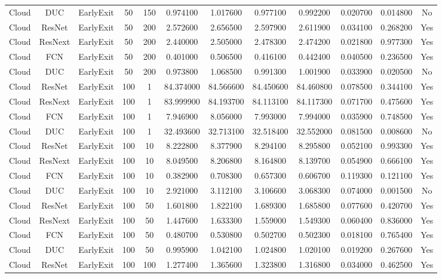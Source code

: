 \begin{tabular}{|c||c||c||c||c||c||c||c||c||c||c||c|}
Cloud & DUC & EarlyExit & 50 & 150 & 0.974100 & 1.017600 & 0.977100 & 0.992200 & 0.020700 & 0.014800 & No \\
Cloud & ResNet & EarlyExit & 50 & 200 & 2.572600 & 2.656500 & 2.597900 & 2.611900 & 0.034100 & 0.268200 & Yes \\
Cloud & ResNext & EarlyExit & 50 & 200 & 2.440000 & 2.505000 & 2.478300 & 2.474200 & 0.021800 & 0.977300 & Yes \\
Cloud & FCN & EarlyExit & 50 & 200 & 0.401000 & 0.506500 & 0.416100 & 0.442400 & 0.040500 & 0.236500 & Yes \\
Cloud & DUC & EarlyExit & 50 & 200 & 0.973800 & 1.068500 & 0.991300 & 1.001900 & 0.033900 & 0.020500 & No \\
Cloud & ResNet & EarlyExit & 100 & 1 & 84.374000 & 84.566600 & 84.450600 & 84.460800 & 0.078500 & 0.344100 & Yes \\
Cloud & ResNext & EarlyExit & 100 & 1 & 83.999900 & 84.193700 & 84.113100 & 84.117300 & 0.071700 & 0.475600 & Yes \\
Cloud & FCN & EarlyExit & 100 & 1 & 7.946900 & 8.056000 & 7.993000 & 7.994000 & 0.035900 & 0.748500 & Yes \\
Cloud & DUC & EarlyExit & 100 & 1 & 32.493600 & 32.713100 & 32.518400 & 32.552000 & 0.081500 & 0.008600 & No \\
Cloud & ResNet & EarlyExit & 100 & 10 & 8.222800 & 8.377900 & 8.294100 & 8.295800 & 0.052100 & 0.993300 & Yes \\
Cloud & ResNext & EarlyExit & 100 & 10 & 8.049500 & 8.206800 & 8.164800 & 8.139700 & 0.054900 & 0.666100 & Yes \\
Cloud & FCN & EarlyExit & 100 & 10 & 0.382900 & 0.708300 & 0.657300 & 0.606700 & 0.119300 & 0.121100 & Yes \\
Cloud & DUC & EarlyExit & 100 & 10 & 2.921000 & 3.112100 & 3.106600 & 3.068300 & 0.074000 & 0.001500 & No \\
Cloud & ResNet & EarlyExit & 100 & 50 & 1.601800 & 1.822100 & 1.689300 & 1.685800 & 0.077600 & 0.420700 & Yes \\
Cloud & ResNext & EarlyExit & 100 & 50 & 1.447600 & 1.633300 & 1.559000 & 1.549300 & 0.060400 & 0.836000 & Yes \\
Cloud & FCN & EarlyExit & 100 & 50 & 0.480700 & 0.530800 & 0.502700 & 0.502300 & 0.018100 & 0.765400 & Yes \\
Cloud & DUC & EarlyExit & 100 & 50 & 0.995900 & 1.042100 & 1.024800 & 1.020100 & 0.019200 & 0.267600 & Yes \\
Cloud & ResNet & EarlyExit & 100 & 100 & 1.277400 & 1.365600 & 1.323800 & 1.316800 & 0.034000 & 0.462500 & Yes \\

\end{tabular}
